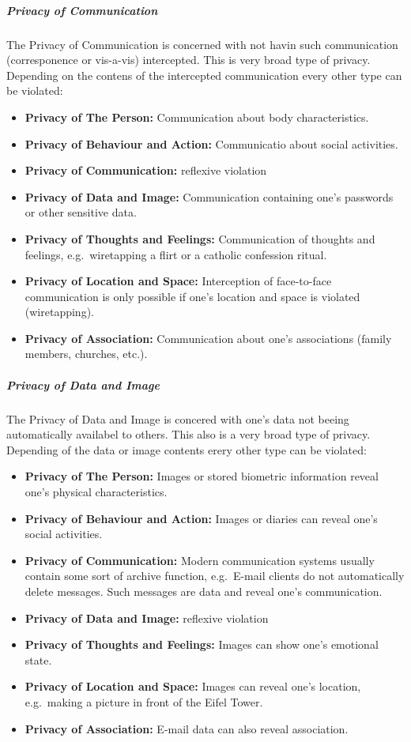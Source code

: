 \subparagraph{Privacy of Communication}

The Privacy of Communication is concerned with not havin such
communication (corresponence or vis-a-vis) intercepted. This is very
broad type of privacy. Depending on the contens of the intercepted
communication every other type can be violated:

\begin{itemize}
\itemsep1pt\parskip0pt
\item
  \textbf{Privacy of The Person:} Communication about body
  characteristics.
\item
  \textbf{Privacy of Behaviour and Action:} Communicatio about social
  activities.
\item
  \textbf{Privacy of Communication:} reflexive violation
\item
  \textbf{Privacy of Data and Image:} Communication containing one's
  passwords or other sensitive data.
\item
  \textbf{Privacy of Thoughts and Feelings:} Communication of thoughts
  and feelings, e.g.~wiretapping a flirt or a catholic confession
  ritual.
\item
  \textbf{Privacy of Location and Space:} Interception of face-to-face
  communication is only possible if one's location and space is violated
  (wiretapping).
\item
  \textbf{Privacy of Association:} Communication about one's
  associations (family members, churches, etc.).
\end{itemize}

\subparagraph{Privacy of Data and Image}

The Privacy of Data and Image is concered with one's data not beeing
automatically availabel to others. This also is a very broad type of
privacy. Depending of the data or image contents erery other type can be
violated:

\begin{itemize}
\itemsep1pt\parskip0pt
\item
  \textbf{Privacy of The Person:} Images or stored biometric information
  reveal one's physical characteristics.
\item
  \textbf{Privacy of Behaviour and Action:} Images or diaries can reveal
  one's social activities.
\item
  \textbf{Privacy of Communication:} Modern communication systems
  usually contain some sort of archive function, e.g.~E-mail clients do
  not automatically delete messages. Such messages are data and reveal
  one's communication.
\item
  \textbf{Privacy of Data and Image:} reflexive violation
\item
  \textbf{Privacy of Thoughts and Feelings:} Images can show one's
  emotional state.
\item
  \textbf{Privacy of Location and Space:} Images can reveal one's
  location, e.g.~making a picture in front of the Eifel Tower.
\item
  \textbf{Privacy of Association:} E-mail data can also reveal
  association.
\end{itemize}

